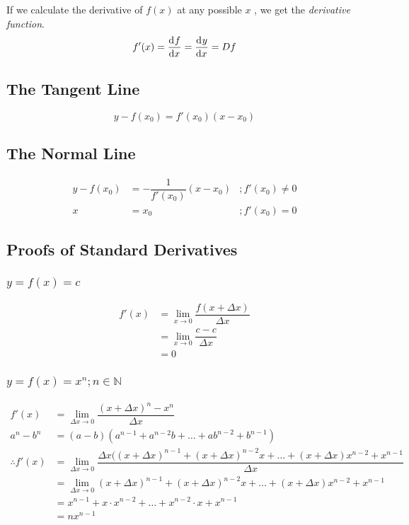 \documentclass[fleqn]{article}
\begin{document}
If we calculate the derivative of $f(x)$ at any possible $x$ , we get the \emph{derivative function}.
\begin{equation*}
	f'(x) = \dod{f}{x} = \dod{y}{x} = D f
\end{equation*}

\subsection{The Tangent Line}

\begin{equation*}
	y - f(x_0) = f'(x_0)(x - x_0)
\end{equation*}

\subsection{The Normal Line}

\begin{align*}
	y - f(x_0) &= - \dfrac{1}{f'(x_0)} (x - x_0) &; f'(x_0) \neq 0\\
	x &= x_0 &; f'(x_0) = 0
\end{align*}

\subsection{Proofs of Standard Derivatives}

\subsubsection{$y = f(x) = c$}

\begin{align*}
	f'(x) &= \lim\limits_{x \rightarrow 0} \dfrac{f(x + \Delta x)}{\Delta x}\\
	&= \lim\limits_{x \rightarrow 0} \dfrac{c - c}{\Delta x}\\
	&= 0
\end{align*}

\subsubsection{$y = f(x) = x^n ; n \in \mathbb{N}$}

\begin{align*}
	f'(x) &= \lim\limits_{\Delta x \rightarrow 0} \dfrac{(x + \Delta x)^n - x^n}{\Delta x}\\
	a^n - b^n &= (a-b)(a^{n-1} + a^{n-2} b + \dots + a b^{n-2} + b^{n-1})\\
	\therefore f'(x) &= \lim\limits_{\Delta x \rightarrow 0} \dfrac{\Delta x((x + \Delta x)^{n-1} + (x + \Delta x)^{n-2} x + \dots + (x + \Delta x) x^{n-2} + x^{n-1}}{\Delta x}\\
	&= \lim\limits_{\Delta x \rightarrow 0} (x + \Delta x)^{n-1} + (x + \Delta x)^{n-2} x + \dots + (x + \Delta x) x^{n-2} + x^{n-1}\\
	&= x^{n-1} + x \cdot x^{n-2} + \dots + x^{n-2} \cdot x + x^{n-1} \\
	&= n x^{n-1}
\end{align*}
\end{document}
